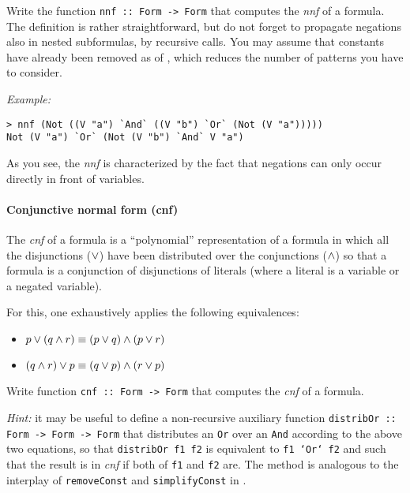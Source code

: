 \documentclass[english]{article}
\begin{document}
\begin{exo}\label{exo:nnf}
  Write the function \texttt{nnf :: Form -> Form} that computes the \emph{nnf}
  of a formula. The definition is rather straightforward, but do not forget to
  propagate negations also in nested subformulas, by recursive calls. You may
  assume that constants have already been removed as of
  , which reduces the number of patterns you have to
  consider.
\end{exo}

\noindent
\emph{Example:}
\begin{lstlisting}
> nnf (Not ((V "a") `And` ((V "b") `Or` (Not (V "a")))))
Not (V "a") `Or` (Not (V "b") `And` V "a")
\end{lstlisting}
As you see, the \emph{nnf} is characterized by the fact that negations can
only occur directly in front of variables.


\paragraph{Conjunctive normal form (cnf)} The \emph{cnf} of a formula is a
``polynomial'' representation of a formula in which all the disjunctions
($\lor$) have been distributed over the conjunctions ($\land$) so that a formula
is a conjunction of disjunctions of literals (where a literal is a variable or
a negated variable).

For this, one exhaustively applies the following equivalences:
\begin{itemize}
\item $p \lor (q \land r) \equiv (p \lor q) \land (p \lor r)$
\item $(q \land r) \lor p  \equiv (q \lor p) \land (r \lor p)$
\end{itemize}

\begin{exo}\label{exo:cnf}
Write function \texttt{cnf :: Form -> Form} that computes the \emph{cnf} of a
formula.

\emph{Hint:} it may be useful to define a non-recursive auxiliary function
\texttt{distribOr :: Form -> Form -> Form} that distributes an \texttt{Or} over an \texttt{And}
according to the above two equations, so that \texttt{distribOr f1 f2} is
equivalent to \texttt{f1 `Or` f2} and such that the result is in \emph{cnf} if
both of \texttt{f1} and \texttt{f2} are. The method is analogous to the
interplay of \texttt{removeConst} and \texttt{simplifyConst} in .
\end{exo}
\end{document}
